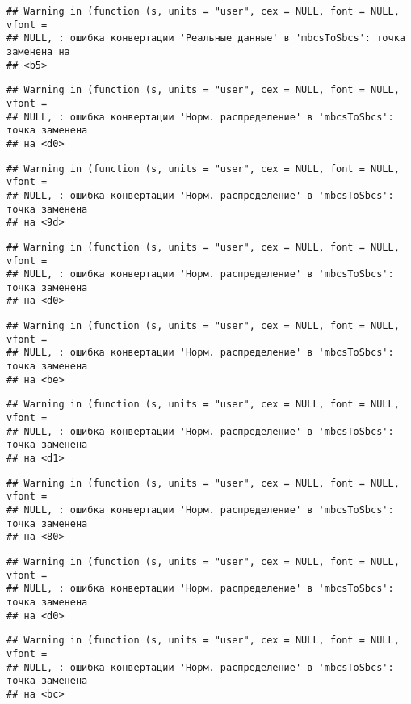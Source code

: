 \documentclass[
]{article}
\begin{document}
\begin{verbatim}
## Warning in (function (s, units = "user", cex = NULL, font = NULL, vfont =
## NULL, : ошибка конвертации 'Реальные данные' в 'mbcsToSbcs': точка заменена на
## <b5>
\end{verbatim}

\begin{verbatim}
## Warning in (function (s, units = "user", cex = NULL, font = NULL, vfont =
## NULL, : ошибка конвертации 'Норм. распределение' в 'mbcsToSbcs': точка заменена
## на <d0>
\end{verbatim}

\begin{verbatim}
## Warning in (function (s, units = "user", cex = NULL, font = NULL, vfont =
## NULL, : ошибка конвертации 'Норм. распределение' в 'mbcsToSbcs': точка заменена
## на <9d>
\end{verbatim}

\begin{verbatim}
## Warning in (function (s, units = "user", cex = NULL, font = NULL, vfont =
## NULL, : ошибка конвертации 'Норм. распределение' в 'mbcsToSbcs': точка заменена
## на <d0>
\end{verbatim}

\begin{verbatim}
## Warning in (function (s, units = "user", cex = NULL, font = NULL, vfont =
## NULL, : ошибка конвертации 'Норм. распределение' в 'mbcsToSbcs': точка заменена
## на <be>
\end{verbatim}

\begin{verbatim}
## Warning in (function (s, units = "user", cex = NULL, font = NULL, vfont =
## NULL, : ошибка конвертации 'Норм. распределение' в 'mbcsToSbcs': точка заменена
## на <d1>
\end{verbatim}

\begin{verbatim}
## Warning in (function (s, units = "user", cex = NULL, font = NULL, vfont =
## NULL, : ошибка конвертации 'Норм. распределение' в 'mbcsToSbcs': точка заменена
## на <80>
\end{verbatim}

\begin{verbatim}
## Warning in (function (s, units = "user", cex = NULL, font = NULL, vfont =
## NULL, : ошибка конвертации 'Норм. распределение' в 'mbcsToSbcs': точка заменена
## на <d0>
\end{verbatim}

\begin{verbatim}
## Warning in (function (s, units = "user", cex = NULL, font = NULL, vfont =
## NULL, : ошибка конвертации 'Норм. распределение' в 'mbcsToSbcs': точка заменена
## на <bc>
\end{verbatim}
\end{document}
